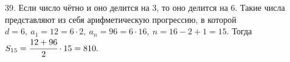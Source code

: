 39. Если число чётно и оно делится на 3, то оно делится на 6. Такие числа представляют из себя арифметическую прогрессию, в которой $d=6,\ a_1=12=6\cdot2,\ a_n=96=6\cdot16,\ n=16-2+1=15.$ Тогда $S_{15}=\cfrac{12+96}{2}\cdot15=810.$\\
